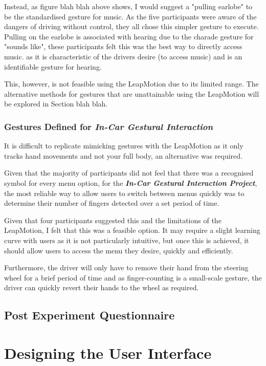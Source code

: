 \documentclass{l4proj}
\begin{document}
Instead, as figure blah blah \cite{} above shows, I would suggest a "pulling earlobe" to be the standardised gesture for music. As the five participants were aware of the dangers of driving without control, they all chose this simpler gesture to execute. Pulling on the earlobe is associated with hearing due to the charade gesture for "sounds like", these participants felt this was the best way to directly access music. as it is characteristic of the drivers desire (to access music) and is an identifiable gesture for hearing.

This, however, is not feasible using the LeapMotion due to its limited range. The alternative methods for gestures that are unattainable using the LeapMotion will be explored in Section blah blah.

\subsubsection{Gestures Defined for \textbf{\textit{In-Car Gestural Interaction}}}
\vspace{-3mm}
It is difficult to replicate mimicking gestures with the LeapMotion as it only tracks hand movements and not your full body, an alternative was required. 

Given that the majority of participants did not feel that there was a recognised symbol for every menu option, for the \textbf{\textit{In-Car Gestural Interaction Project}}, the most reliable way to allow users to switch between menus quickly was to determine their number of fingers detected over a set period of time. 

Given that four participants suggested this and the limitations of the LeapMotion, I felt that this was a feasible option. It may require a slight learning curve with users as it is not particularly intuitive, but once this is achieved, it should allow users to access the menu they desire, quickly and efficiently.

Furthermore, the driver will only have to remove their hand from the steering wheel for a brief period of time and as finger-counting is a small-scale gesture, the driver can quickly revert their hands to the wheel as required.

\subsection{Post Experiment Questionnaire}
\vspace{-3mm}
\section{Designing the User Interface}
\vspace{-3mm}
\end{document}
